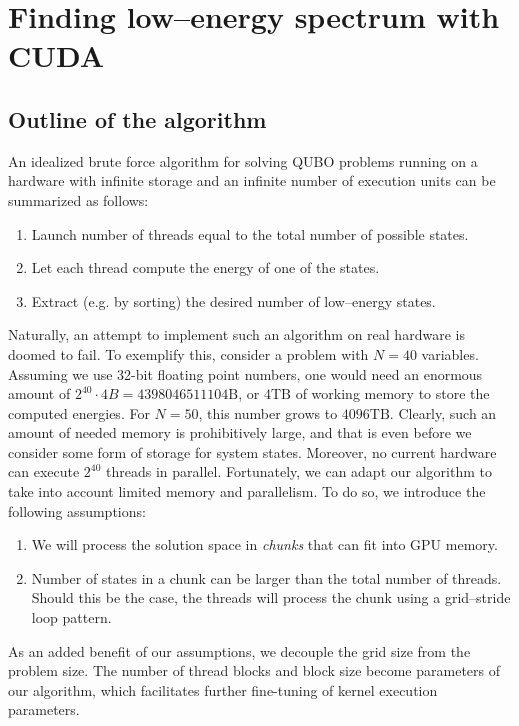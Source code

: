 
\section{Finding low--energy spectrum with CUDA}
\subsection{Outline of the algorithm}
An idealized brute force algorithm for solving QUBO problems running on a
hardware with infinite storage and an infinite number of execution units can be
summarized as follows:
\begin{enumerate}
  \item Launch number of threads equal to the total number of possible states.
  \item Let each thread compute the energy of one of the states.
  \item Extract (e.g. by sorting) the desired number of low--energy states.
\end{enumerate}
Naturally, an attempt to implement such an algorithm on real hardware is doomed to fail. To exemplify this, consider a problem with $N=40$ variables. Assuming we use 32-bit floating point numbers, one would need an enormous amount of $2^{40}\cdot 4B = 4398046511104\mbox{B}$, or $4\mbox{TB}$ of working memory to store the computed energies. For $N=50$, this number grows to $4096\mbox{TB}$. Clearly, such an amount of needed memory is prohibitively large, and that is even before we consider some form of storage for system states. Moreover, no current hardware can execute $2^{40}$ threads in parallel. Fortunately, we can adapt our algorithm to take into account limited memory and parallelism. To do so, we introduce the following assumptions:
\begin{enumerate}
  \item We will process the solution space in \emph{chunks} that can fit into GPU
    memory.
  \item Number of states in a chunk can be larger than the total number of threads.
    Should this be the case, the threads will process the chunk using a
    grid--stride loop pattern.
\end{enumerate}
As an added benefit of our assumptions, we decouple the grid size from the problem size. The number of thread blocks and block size become parameters of our algorithm, which facilitates further fine-tuning of kernel execution parameters.

